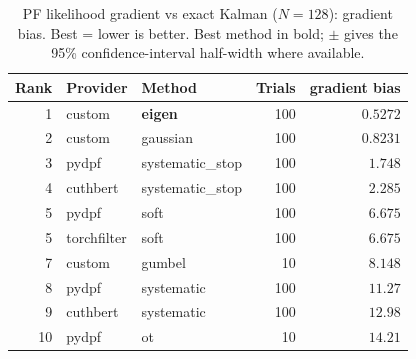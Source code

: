 \begin{table}[!htbp]
\centering
\small
\caption{PF likelihood gradient vs exact Kalman ($N=128$): gradient bias. Best = lower is better. Best method in bold; $\pm$ gives the 95\% confidence-interval half-width where available.}
\label{tab:pf-likelihood-gradient-vs-exact-kalman-gradient-bias}
\begin{tabular}{rllrr}
\toprule
Rank & Provider & Method & Trials & gradient bias \\
\midrule
1 & custom & \textbf{eigen} & 100 & $\mathbf{0.5272}$ \\
2 & custom & gaussian & 100 & $0.8231$ \\
3 & pydpf & systematic\_stop & 100 & $1.748$ \\
4 & cuthbert & systematic\_stop & 100 & $2.285$ \\
5 & pydpf & soft & 100 & $6.675$ \\
5 & torchfilter & soft & 100 & $6.675$ \\
7 & custom & gumbel & 10 & $8.148$ \\
8 & pydpf & systematic & 100 & $11.27$ \\
9 & cuthbert & systematic & 100 & $12.98$ \\
10 & pydpf & ot & 10 & $14.21$ \\
\bottomrule
\end{tabular}
\end{table}
